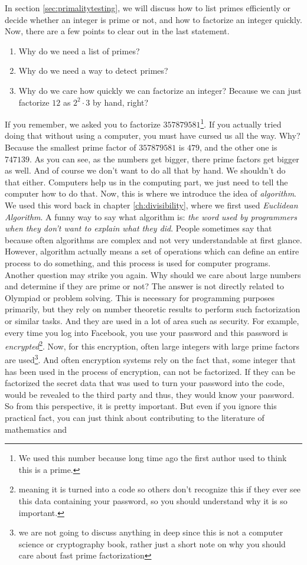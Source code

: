 \documentclass{subfiles}
\begin{document}
	In section \eqref{sec:primalitytesting}, we will discuss how to list primes efficiently or decide whether an integer is prime or not, and how to factorize an integer quickly. Now, there are a few points to clear out in the last statement.
		\begin{enumerate}
			\item Why do we need a list of primes?
			\item Why do we need a way to detect primes?
			\item Why do we care how quickly we can factorize an integer? Because we can just factorize $12$ as $2^2\cdot3$ by hand, right?
		\end{enumerate}
	If you remember, we asked you to factorize $357879581$\footnote{We used this number because long time ago the first author used to think this is a prime.}. If you actually tried doing that without using a computer, you must have cursed us all the way. Why? Because the smallest prime factor of $357879581$ is $479$, and the other one is $747139$. As you can see, as the numbers get bigger, there prime factors get bigger as well. And of course we don't want to do all that by hand. We shouldn't do that either. Computers help us in the computing part, we just need to tell the computer how to do that. Now, this is where we introduce the idea of \textit{algorithm}. We used this word back in chapter \eqref{ch:divisibility}, where we first used \textit{Euclidean Algorithm}. A funny way to say what algorithm is: \textit{the word used by programmers when they don't want to explain what they did}. People sometimes say that because often algorithms are complex and not very understandable at first glance. However, algorithm actually means a set of operations which can define an entire process to do something, and this process is used for computer programs. Another question may strike you again. Why should we care about large numbers and determine if they are prime or not? The answer is not directly related to Olympiad or problem solving. This is necessary for programming purposes primarily, but they rely on number theoretic results to perform such factorization or similar tasks. And they are used in a lot of area such as security. For example, every time you log into Facebook, you use your password and this password is \textit{encrypted}\footnote{meaning it is turned into a code so others don't recognize this if they ever see this data containing your password, so you should understand why it is so important.}. Now, for this encryption, often large integers with large prime factors are used\footnote{we are not going to discuss anything in deep since this is not a computer science or cryptography book, rather just a short note on why you should care about fast prime factorization}. And often encryption systems rely on the fact that, some integer that has been used in the process of encryption, can not be factorized. If they can be factorized the secret data that was used to turn your password into the code, would be revealed to the third party and thus, they would know your password. So from this perspective, it is pretty important. But even if you ignore this practical fact, you can just think about contributing to the literature of mathematics and 
\end{document}
